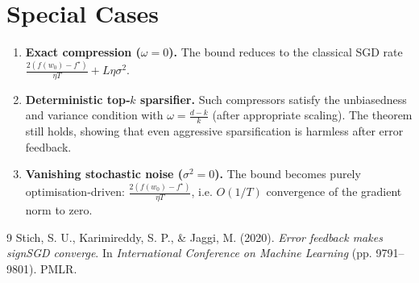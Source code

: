 \documentclass{article}
\begin{document}
\section*{Special Cases}
\begin{enumerate}[label=(\alph*)]
\item \textbf{Exact compression ($\omega=0$).}
The bound reduces to the classical SGD rate
$\frac{2(f(w_0)-f^{\star})}{\eta T}+L\eta\sigma^{2}$.
\item \textbf{Deterministic top‑$k$ sparsifier.}
Such compressors satisfy the unbiasedness and variance condition with
$\omega = \frac{d-k}{k}$ (after appropriate scaling). The theorem still
holds, showing that even aggressive sparsification is harmless after
error feedback.
\item \textbf{Vanishing stochastic noise ($\sigma^{2}=0$).}
The bound becomes purely optimisation‑driven:
$\frac{2(f(w_0)-f^{\star})}{\eta T}$, i.e. $O(1/T)$ convergence of the
gradient norm to zero.
\end{enumerate}

\begin{thebibliography}{9}
Stich, S. U., Karimireddy, S. P., \& Jaggi, M. (2020). \emph{Error feedback
makes signSGD converge}. In \textit{International Conference on Machine
Learning} (pp. 9791–9801). PMLR.
\end{thebibliography}
\end{document}
